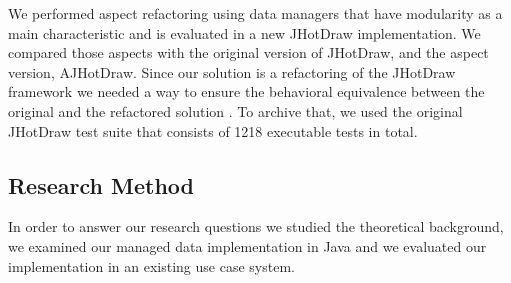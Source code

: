 



We performed aspect refactoring using data managers that have modularity as a main characteristic and is evaluated in a new JHotDraw implementation.
We compared those aspects with the original version of JHotDraw, and the aspect version, AJHotDraw. 
Since our solution is a refactoring of the JHotDraw framework we needed a way to ensure the behavioral equivalence between the original and the refactored solution \cite{fowler2009refactoring}.
To archive that, we used the original JHotDraw test suite that consists of 1218 executable tests in total.

\subsection{Research Method}\label{Research Method}
In order to answer our research questions we studied the theoretical background, we examined our managed data implementation in Java and we evaluated our implementation in an existing use case system.


